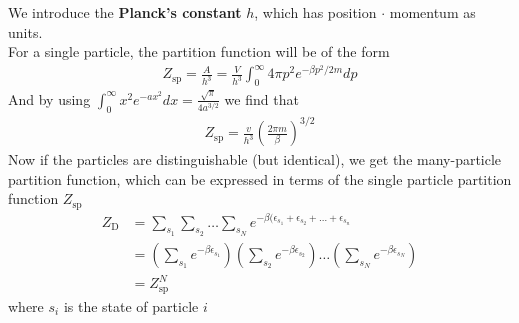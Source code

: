 We introduce the \textbf{Planck's constant} $h$, which has position $\cdot$ momentum as units.\\

For a single particle, the partition function will be of the form
\begin{align*}
	Z_{\text{sp}} = \frac{A}{h^3} = \frac{V}{h^3} \int_{0}^{\infty} 4\pi p^2 e^{- \beta p^2/2m}dp
\end{align*}
And by using $\int_{0}^{\infty}x^2 e^{-ax^2}dx = \frac{\sqrt{\pi}}{4a^{3/2}}$ we find that
\begin{align*}
	Z_{\text{sp}} = \frac{v}{h^3} \left(\frac{2\pi m}{\beta}\right)^{3/2}
\end{align*}
Now if the particles are distinguishable (but identical), we get the many-particle partition function, which can be expressed in terms of the single particle partition function $Z_{\text{sp}}$
\begin{align*}
	Z_{\text{D}} &= \sum_{s_1} \sum_{s_2} \ldots \sum_{s_N}e^{-\beta(\epsilon_{s_1} + \epsilon_{s_2}+ \ldots + \epsilon_{s_n}}\\
							 &= \left(\sum_{s_1}e^{-\beta \epsilon_{s_1}}\right) \left(\sum_{s_2}e^{-\beta \epsilon_{s_2}}\right) \dots \left(\sum_{s_N}e^{-\beta \epsilon_{s_N}}\right)\\
							&= Z_{\text{sp}}^N
\end{align*}
where $s_i$ is the state of particle $i$
